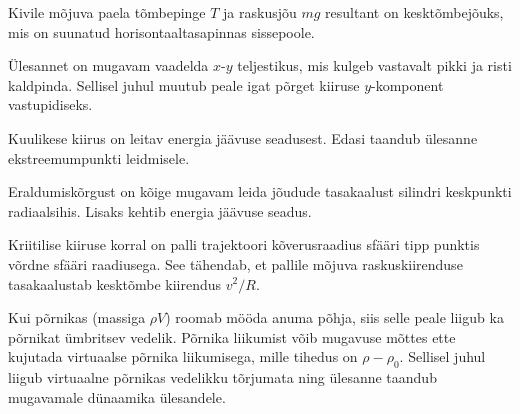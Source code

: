\documentclass[10pt]{article}
\begin{document}
{%

\hint
Kivile mõjuva paela tõmbepinge $T$ ja raskusjõu $mg$ resultant on kesktõmbejõuks, mis on suunatud horisontaaltasapinnas sissepoole.
\probend
\bigskip


\hint
Ülesannet on mugavam vaadelda $x$-$y$ teljestikus, mis kulgeb vastavalt pikki ja risti kaldpinda. Sellisel juhul muutub peale igat põrget kiiruse $y$-komponent vastupidiseks.
\probend
\bigskip


\hint
Kuulikese kiirus on leitav energia jäävuse seadusest. Edasi taandub ülesanne ekstreemumpunkti leidmisele.
\probend
\bigskip


\hint
Eraldumiskõrgust on kõige mugavam leida jõudude tasakaalust silindri keskpunkti radiaalsihis. Lisaks kehtib energia jäävuse seadus.
\probend
\bigskip


\hint
Kriitilise kiiruse korral on palli trajektoori kõverusraadius sfääri tipp punktis võrdne sfääri raadiusega. See tähendab, et pallile mõjuva raskuskiirenduse tasakaalustab kesktõmbe kiirendus $v^2/R$.
\probend
\bigskip


\hint
Kui põrnikas (massiga $\rho V$) roomab mööda anuma põhja, siis selle peale liigub ka põrnikat ümbritsev vedelik. Põrnika liikumist võib mugavuse mõttes ette kujutada virtuaalse põrnika liikumisega, mille tihedus on $\rho - \rho_0$. Sellisel juhul liigub virtuaalne põrnikas vedelikku tõrjumata ning ülesanne taandub mugavamale dünaamika ülesandele.
\probend
\bigskip


}
\end{document}
